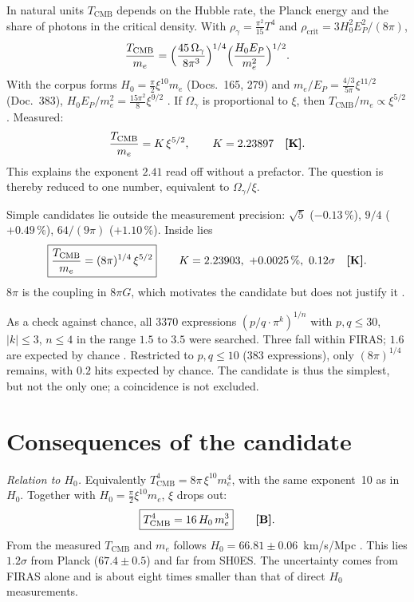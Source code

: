 In natural units $T_{\mathrm{CMB}}$ depends on the Hubble rate, the Planck energy and the share of
photons in the critical density. With $\rho_\gamma=\frac{\pi^2}{15}T^4$ and
$\rho_{\mathrm{crit}}=3H_0^2E_P^2/(8\pi)$,
\begin{equation}
\frac{T_{\mathrm{CMB}}}{m_e}=\Bigl(\frac{45\,\Omega_\gamma}{8\pi^3}\Bigr)^{1/4}
\Bigl(\frac{H_0E_P}{m_e^2}\Bigr)^{1/2}.
\end{equation}
With the corpus forms $H_0=\frac{\pi}{2}\xi^{10}m_e$ (Docs.~165, 279) and
$m_e/E_P=\frac{4/3}{5\pi}\xi^{11/2}$ (Doc.~383), $H_0E_P/m_e^2=\frac{15\pi^2}{8}\xi^{9/2}$ \BM. If
$\Omega_\gamma$ is proportional to $\xi$, then $T_{\mathrm{CMB}}/m_e\propto\xi^{5/2}$. Measured:
\begin{equation}
\frac{T_{\mathrm{CMB}}}{m_e}=K\,\xi^{5/2},\qquad K=2.23897 \quad\textbf{[K]}.
\end{equation}
This explains the exponent $2.41$ read off without a prefactor. The question is thereby reduced to
one number, equivalent to $\Omega_\gamma/\xi$.

Simple candidates lie outside the measurement precision: $\sqrt5$ ($-0.13\,\%$), $9/4$
($+0.49\,\%$), $64/(9\pi)$ ($+1.10\,\%$). Inside lies
\begin{equation}
\boxed{\frac{T_{\mathrm{CMB}}}{m_e}=(8\pi)^{1/4}\,\xi^{5/2}}
\qquad K=2.23903,\ +0.0025\,\%,\ 0.12\sigma \quad\textbf{[K]}.
\end{equation}
$8\pi$ is the coupling in $8\pi G$, which motivates the candidate but does not justify it \SM.

As a check against chance, all $3370$ expressions $(p/q\cdot\pi^k)^{1/n}$ with $p,q\le30$,
$|k|\le3$, $n\le4$ in the range $1.5$ to $3.5$ were searched. Three fall within FIRAS; $1.6$ are
expected by chance \KM. Restricted to $p,q\le10$ (383 expressions), only $(8\pi)^{1/4}$ remains,
with $0.2$ hits expected by chance. The candidate is thus the simplest, but not the only one; a
coincidence is not excluded.

\section{Consequences of the candidate}

\emph{Relation to $H_0$.} Equivalently $T_{\mathrm{CMB}}^4=8\pi\,\xi^{10}m_e^4$, with the same
exponent~10 as in $H_0$. Together with $H_0=\frac{\pi}{2}\xi^{10}m_e$, $\xi$ drops out:
\begin{equation}
\boxed{T_{\mathrm{CMB}}^4=16\,H_0\,m_e^3}\qquad\textbf{[B]}.
\end{equation}
From the measured $T_{\mathrm{CMB}}$ and $m_e$ follows $H_0=66.81\pm0.06$~km/s/Mpc \KM. This lies
$1.2\sigma$ from Planck ($67.4\pm0.5$) and far from SH0ES. The uncertainty comes from FIRAS alone
and is about eight times smaller than that of direct $H_0$ measurements.

